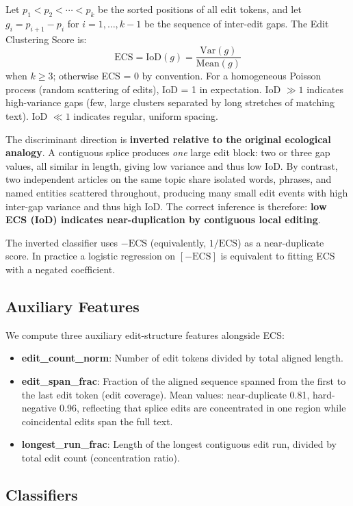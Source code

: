 \documentclass[11pt,letterpaper]{article}
\begin{document}
Let $p_1 < p_2 < \cdots < p_k$ be the sorted positions of all edit tokens, and let $g_i = p_{i+1} - p_i$ for $i = 1, \ldots, k-1$ be the sequence of inter-edit gaps. The Edit Clustering Score is:
\[
\text{ECS} = \text{IoD}(g) = \frac{\text{Var}(g)}{\text{Mean}(g)}
\]
when $k \geq 3$; otherwise ECS = 0 by convention. For a homogeneous Poisson process (random scattering of edits), IoD = 1 in expectation. IoD $\gg 1$ indicates high-variance gaps (few, large clusters separated by long stretches of matching text). IoD $\ll 1$ indicates regular, uniform spacing.

The discriminant direction is \textbf{inverted relative to the original ecological analogy}. A contiguous splice produces \emph{one} large edit block: two or three gap values, all similar in length, giving low variance and thus low IoD. By contrast, two independent articles on the same topic share isolated words, phrases, and named entities scattered throughout, producing many small edit events with high inter-gap variance and thus high IoD. The correct inference is therefore: \textbf{low ECS (IoD) indicates near-duplication by contiguous local editing}.

The inverted classifier uses $-\text{ECS}$ (equivalently, $1/\text{ECS}$) as a near-duplicate score. In practice a logistic regression on $[-\text{ECS}]$ is equivalent to fitting ECS with a negated coefficient.

\subsection{Auxiliary Features}

We compute three auxiliary edit-structure features alongside ECS:
\begin{itemize}
    \item \textbf{edit\_count\_norm}: Number of edit tokens divided by total aligned length.
    \item \textbf{edit\_span\_frac}: Fraction of the aligned sequence spanned from the first to the last edit token (edit coverage). Mean values: near-duplicate 0.81, hard-negative 0.96, reflecting that splice edits are concentrated in one region while coincidental edits span the full text.
    \item \textbf{longest\_run\_frac}: Length of the longest contiguous edit run, divided by total edit count (concentration ratio).
\end{itemize}

\subsection{Classifiers}
\end{document}

